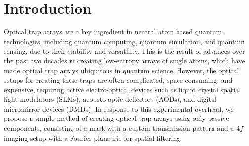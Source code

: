 
\section{Introduction}
Optical trap arrays are a key ingredient in neutral atom based quantum technologies, including quantum computing, quantum simulation, and quantum sensing, due to their stability and versatility\cite{Kaufman2021,Morgado2021}. This is the result of advances over the past two decades in creating low-entropy arrays of single atoms, which have made optical trap arrays ubiquitous in quantum science. However, the optical setups for creating these traps are often complicated, space-consuming, and expensive, requiring active electro-optical devices such as liquid crystal spatial light modulators (SLMs)\cite{DKim2019}, acousto-optic deflectors (AODs)\cite{Graham2022}, and digital micromirror devices (DMDs)\cite{YWang2020}. In response to this experimental overhead, we propose a simple method of creating optical trap arrays using only passive components, consisting of a mask with a custom transmission pattern and a $4f$ imaging setup with a Fourier plane iris for spatial filtering.


